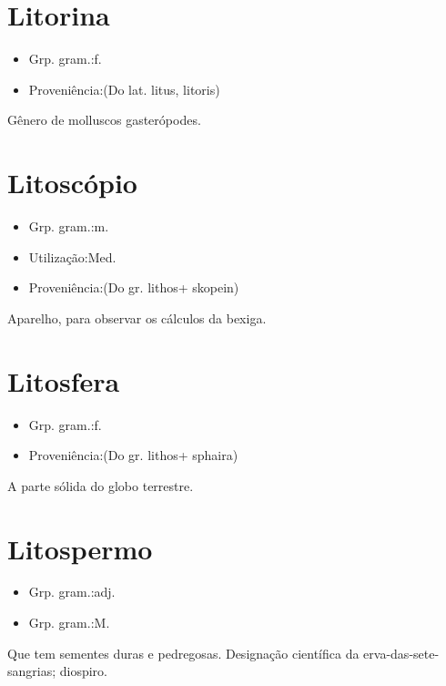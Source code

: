 \section{Litorina}
\begin{itemize}
\item {Grp. gram.:f.}
\end{itemize}
\begin{itemize}
\item {Proveniência:(Do lat. \textunderscore litus\textunderscore , \textunderscore litoris\textunderscore )}
\end{itemize}
Gênero de molluscos gasterópodes.
\section{Litoscópio}
\begin{itemize}
\item {Grp. gram.:m.}
\end{itemize}
\begin{itemize}
\item {Utilização:Med.}
\end{itemize}
\begin{itemize}
\item {Proveniência:(Do gr. \textunderscore lithos\textunderscore  + \textunderscore skopein\textunderscore )}
\end{itemize}
Aparelho, para observar os cálculos da bexiga.
\section{Litosfera}
\begin{itemize}
\item {Grp. gram.:f.}
\end{itemize}
\begin{itemize}
\item {Proveniência:(Do gr. \textunderscore lithos\textunderscore  + \textunderscore sphaira\textunderscore )}
\end{itemize}
A parte sólida do globo terrestre.
\section{Litospermo}
\begin{itemize}
\item {Grp. gram.:adj.}
\end{itemize}
\begin{itemize}
\item {Grp. gram.:M.}
\end{itemize}
Que tem sementes duras e pedregosas.
Designação científica da erva-das-sete-sangrias; diospiro.
